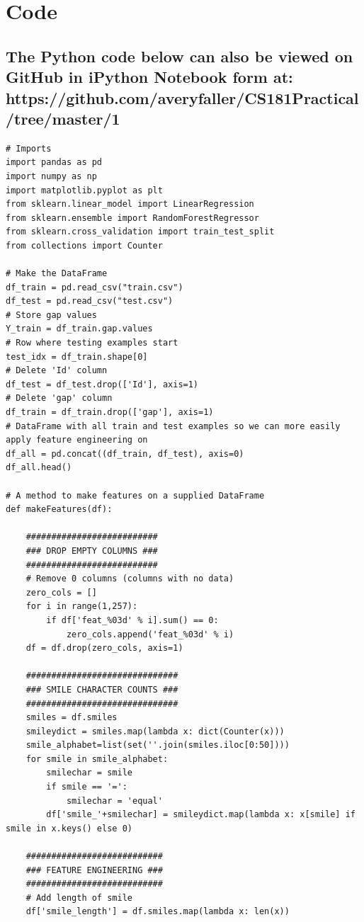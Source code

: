 \documentclass[]{article}
\begin{document}
\section{Code}
\subsection*{The Python code below can also be viewed on GitHub in iPython Notebook form at: https://github.com/averyfaller/CS181Practical/tree/master/1}
\begin{flushleft}
\begin{lstlisting}
# Imports
import pandas as pd
import numpy as np
import matplotlib.pyplot as plt
from sklearn.linear_model import LinearRegression
from sklearn.ensemble import RandomForestRegressor
from sklearn.cross_validation import train_test_split
from collections import Counter

# Make the DataFrame
df_train = pd.read_csv("train.csv")
df_test = pd.read_csv("test.csv")
# Store gap values
Y_train = df_train.gap.values
# Row where testing examples start
test_idx = df_train.shape[0]
# Delete 'Id' column
df_test = df_test.drop(['Id'], axis=1)
# Delete 'gap' column
df_train = df_train.drop(['gap'], axis=1)
# DataFrame with all train and test examples so we can more easily apply feature engineering on
df_all = pd.concat((df_train, df_test), axis=0)
df_all.head()

# A method to make features on a supplied DataFrame
def makeFeatures(df):
    
    ##########################
    ### DROP EMPTY COLUMNS ###
    ##########################
    # Remove 0 columns (columns with no data)
    zero_cols = []
    for i in range(1,257):
        if df['feat_%03d' % i].sum() == 0:
            zero_cols.append('feat_%03d' % i)
    df = df.drop(zero_cols, axis=1)
    
    ##############################
    ### SMILE CHARACTER COUNTS ###
    ##############################
    smiles = df.smiles
    smileydict = smiles.map(lambda x: dict(Counter(x)))
    smile_alphabet=list(set(''.join(smiles.iloc[0:50])))
    for smile in smile_alphabet:
        smilechar = smile
        if smile == '=':
            smilechar = 'equal'
        df['smile_'+smilechar] = smileydict.map(lambda x: x[smile] if smile in x.keys() else 0)
    
    ###########################
    ### FEATURE ENGINEERING ###
    ###########################
    # Add length of smile
    df['smile_length'] = df.smiles.map(lambda x: len(x))


\end{lstlisting}
\end{flushleft}
\end{document}
